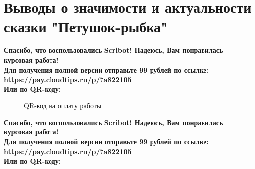 \documentclass{article}
\begin{document}
\section{Выводы о значимости и актуальности сказки "Петушок-рыбка"}
\begin{center}
    \textbf{
        Спасибо, что воспользовались Scribot! Надеюсь, Вам понравилась курсовая работа!\\
        Для получения полной версии отправьте 99 рублей по ссылке:\\
        https://pay.cloudtips.ru/p/7a822105\\
        Или по QR-коду:\\
    }
\end{center}
\begin{figure}[h]
    \caption{QR-код на оплату работы.}
    \label{ris:image}
\end{figure}
\newpage
\begin{center}
    \textbf{
        Спасибо, что воспользовались Scribot! Надеюсь, Вам понравилась курсовая работа!\\
        Для получения полной версии отправьте 99 рублей по ссылке:\\
        https://pay.cloudtips.ru/p/7a822105\\
        Или по QR-коду:\\
    }
\end{center}
\end{document}
